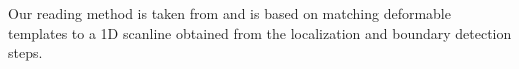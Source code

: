 

Our reading method is taken from \cite{Gallo2011} and is based on matching
deformable templates to a 1D scanline obtained from the localization and
boundary detection steps.

